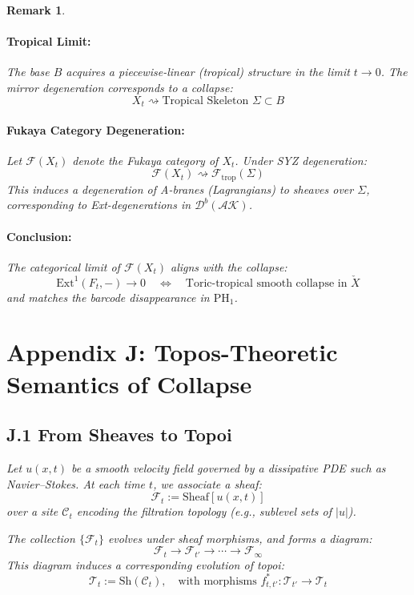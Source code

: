 \documentclass[11pt]{article}
\newtheorem{remark}[theorem]{Remark}
\begin{document}
\begin{remark}
\paragraph{Tropical Limit:}
The base $B$ acquires a piecewise-linear (tropical) structure in the limit $t \to 0$.
The mirror degeneration corresponds to a collapse:
\[
X_t \rightsquigarrow \text{Tropical Skeleton } \Sigma \subset B
\]

\paragraph{Fukaya Category Degeneration:}
Let $\mathcal{F}(X_t)$ denote the Fukaya category of $X_t$. Under SYZ degeneration:
\[
\mathcal{F}(X_t) \rightsquigarrow \mathcal{F}_{\mathrm{trop}}(\Sigma)
\]
This induces a degeneration of A-branes (Lagrangians) to sheaves over $\Sigma$, corresponding to Ext-degenerations in $\mathcal{D}^b(\mathcal{AK})$.

\paragraph{Conclusion:}
The categorical limit of $\mathcal{F}(X_t)$ aligns with the collapse:
\[
\mathrm{Ext}^1(F_t, -) \to 0 \quad \Longleftrightarrow \quad \text{Toric-tropical smooth collapse in } \check{X}
\]
and matches the barcode disappearance in $\mathrm{PH}_1$.




\section*{Appendix J: Topos-Theoretic Semantics of Collapse}

\subsection*{J.1 From Sheaves to Topoi}

Let $u(x,t)$ be a smooth velocity field governed by a dissipative PDE such as Navier–Stokes.  
At each time $t$, we associate a sheaf:
\[
\mathcal{F}_t := \mathrm{Sheaf}[u(x,t)]
\]
over a site $\mathcal{C}_t$ encoding the filtration topology (e.g., sublevel sets of $|u|$).

The collection $\{\mathcal{F}_t\}$ evolves under sheaf morphisms, and forms a diagram:
\[
\mathcal{F}_t \longrightarrow \mathcal{F}_{t'} \longrightarrow \cdots \longrightarrow \mathcal{F}_\infty
\]
This diagram induces a corresponding evolution of topoi:
\[
\mathscr{T}_t := \mathrm{Sh}(\mathcal{C}_t), \quad \text{with morphisms } f_{t,t'}^* : \mathscr{T}_{t'} \to \mathscr{T}_t
\]


\end{remark}
\end{document}
